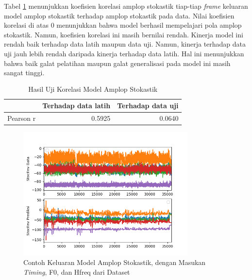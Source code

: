 Tabel \ref{tab-stoc-testing-results} menunjukkan koefisien korelasi amplop stokastik tiap-tiap \textit{frame} keluaran model amplop stokastik terhadap amplop stokastik pada data. Nilai koefisien korelasi di atas 0 menunjukkan bahwa model berhasil mempelajari pola amplop stokastik. Namun, koefisien korelasi ini masih bernilai rendah. Kinerja model ini rendah baik terhadap data latih maupun data uji. Namun, kinerja terhadap data uji jauh lebih rendah daripada kinerja terhadap data latih. Hal ini menunjukkan bahwa baik galat pelatihan maupun galat generalisasi pada model ini masih sangat tinggi.

\begin{table}[htbp]
    \centering
    \caption{Hasil Uji Korelasi Model Amplop Stokastik}\label{tab-stoc-testing-results}
    \begin{tabular}{ |l|r|r| } 
     \cline{2-3}
     \multicolumn{1}{l|}{}&Terhadap data latih&Terhadap data uji\\\hline
	 Pearson r&0.5925  &0.0640\\\hline
    \end{tabular}
\end{table}

\begin{figure}[htbp]
    \centering
    \includegraphics[width=0.8\textwidth]{resources/Analisis_StocEnv.png}
    \caption{Contoh Keluaran Model Amplop Stokastik, dengan Masukan \textit{Timing}, F0, dan Hfreq dari Dataset}\label{fig-stocenv-output-sample}
\end{figure}


